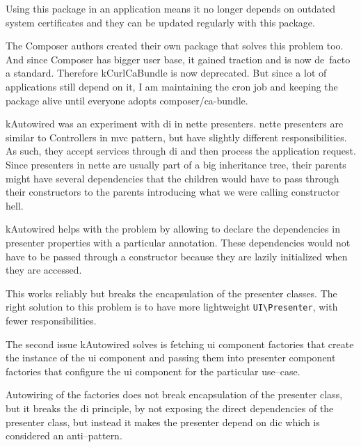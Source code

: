 Using this package in an application means it no longer depends on outdated system certificates and they can be updated regularly with this package.

The Composer authors created their own package  that solves this problem too. And since Composer has bigger user base, it gained traction and is now de~facto a standard. Therefore \gls{kCurlCaBundle} is now deprecated. But since a lot of applications still depend on it, I am maintaining the cron job and keeping the package alive until everyone adopts composer/ca-bundle.

 \label{sec:state:autowired}

\gls{kAutowired} was an experiment with \gls{di} in \gls{nette} presenters. \gls{nette} presenters are similar to Controllers in \gls{mvc} pattern, but have slightly different responsibilities. As such, they accept services through \gls{di} and then process the application request. Since presenters in \gls{nette} are usually part of a big inheritance tree, their parents might have several dependencies that the children would have to pass through their constructors to the parents introducing what we were calling constructor hell.

\gls{kAutowired} helps with the problem by allowing to declare the dependencies in presenter properties with a particular annotation. These dependencies would not have to be passed through a constructor because they are lazily initialized when they are accessed.

This works reliably but breaks the encapsulation of the presenter classes. The right solution to this problem is to have more lightweight \lstinline{UI\Presenter}, with fewer responsibilities.

The second issue \gls{kAutowired} solves is fetching \gls{ui} component factories that create the instance of the \gls{ui} component and passing them into presenter component factories that configure the \gls{ui} component for the particular use--case.

Autowiring of the factories does not break encapsulation of the presenter class, but it breaks the \gls{di} principle, by not exposing the direct dependencies of the presenter class, but instead it makes the presenter depend on \gls{dic} which is considered an anti--pattern.

 \label{sec:state:forms-replicator}

